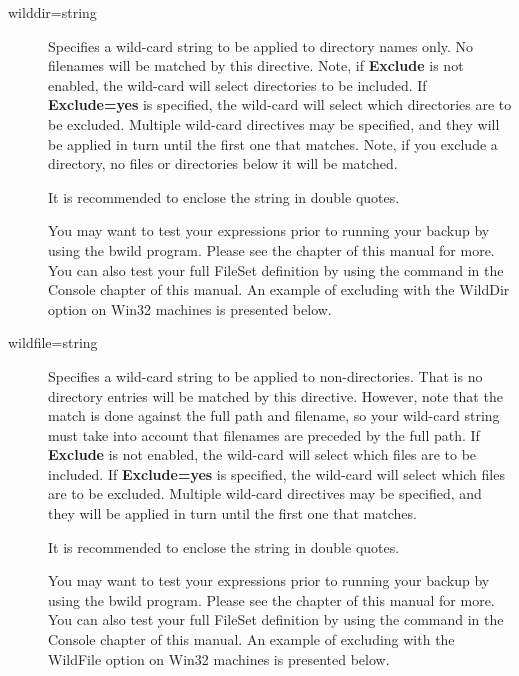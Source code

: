 \begin{description}
\item [wilddir=\lt{}string\gt{}]
   Specifies a wild-card string to be applied to directory names only.  No
   filenames will be matched by this directive.  Note, if {\bf Exclude} is
   not enabled, the wild-card will select directories to be
   included.  If {\bf Exclude=yes} is specified, the wild-card will select
   which directories are to be excluded.  Multiple wild-card directives may be
   specified, and they will be applied in turn until the first one that
   matches.  Note, if you exclude a directory, no files or directories
   below it will be matched.

   It is recommended to enclose the string in double quotes.

   You may want to test your expressions prior to running your
   backup by using the bwild program. Please see the
    chapter of this manual for
   more. You can also test your full FileSet definition by using
   the  command in the Console        
   chapter of this manual.
   An example of excluding with the WildDir option on Win32 machines is    
   presented below.

\item [wildfile=\lt{}string\gt{}]
   Specifies a wild-card string to be applied to non-directories. That
   is no directory entries will be matched by this directive.
   However, note that the match is done against the full path and filename,
   so your wild-card string must take into account that filenames
   are preceded by the full path.
   If {\bf Exclude}
   is not enabled, the wild-card will select which files are to be
   included.  If {\bf Exclude=yes} is specified, the wild-card will select
   which files are to be excluded.  Multiple wild-card directives may be
   specified, and they will be applied in turn until the first one that
   matches.

   It is recommended to enclose the string in double quotes.

   You may want to test your expressions prior to running your
   backup by using the bwild program. Please see the
    chapter of this manual for
   more. You can also test your full FileSet definition by using
   the  command in the Console        
   chapter of this manual.
   An example of excluding with the WildFile option on Win32 machines is    
   presented below.



\end{description}
